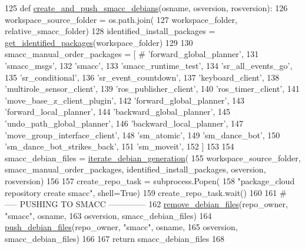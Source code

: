 \begin{DoxyCode}
125 \textcolor{keyword}{def }\hyperlink{namespacegenerate__debs_af7237c463c8e5b4df369e6befc154c50}{create\_and\_push\_smacc\_debians}(osname, osversion, rosversion):
126     workspace\_source\_folder = os.path.join(
127         workspace\_folder, relative\_smacc\_folder)
128     identified\_install\_packages = \hyperlink{namespacegenerate__debs_aa91b87c6d9c3ed04015845cc9298431a}{get\_identified\_packages}(workspace\_folder)
129 
130     smacc\_manual\_order\_packages = [  \textcolor{comment}{# 'forward\_global\_planner',}
131         \textcolor{stringliteral}{'smacc\_msgs'},
132         \textcolor{stringliteral}{'smacc'},
133         \textcolor{stringliteral}{'smacc\_runtime\_test'},
134         \textcolor{stringliteral}{'sr\_all\_events\_go'},
135         \textcolor{stringliteral}{'sr\_conditional'},
136         \textcolor{stringliteral}{'sr\_event\_countdown'},
137         \textcolor{stringliteral}{'keyboard\_client'},
138         \textcolor{stringliteral}{'multirole\_sensor\_client'},
139         \textcolor{stringliteral}{'ros\_publisher\_client'},
140         \textcolor{stringliteral}{'ros\_timer\_client'},
141         \textcolor{stringliteral}{'move\_base\_z\_client\_plugin'},
142         \textcolor{stringliteral}{'forward\_global\_planner'},
143         \textcolor{stringliteral}{'forward\_local\_planner'},
144         \textcolor{stringliteral}{'backward\_global\_planner'},
145         \textcolor{stringliteral}{'undo\_path\_global\_planner'},
146         \textcolor{stringliteral}{'backward\_local\_planner'},        
147         \textcolor{stringliteral}{'move\_group\_interface\_client'},
148         \textcolor{stringliteral}{'sm\_atomic'},
149         \textcolor{stringliteral}{'sm\_dance\_bot'},
150         \textcolor{stringliteral}{'sm\_dance\_bot\_strikes\_back'},
151         \textcolor{stringliteral}{'sm\_moveit'},
152     ]
153 
154     smacc\_debian\_files = \hyperlink{namespacegenerate__debs_a2615a6fc7860b6aa9e920e6b4d886589}{iterate\_debian\_generation}(
155         workspace\_source\_folder, smacc\_manual\_order\_packages, identified\_install\_packages, osversion, 
      rosversion)
156 
157     create\_repo\_task = subprocess.Popen(
158         \textcolor{stringliteral}{"package\_cloud repository create smacc"}, shell=\textcolor{keyword}{True})
159     create\_repo\_task.wait()
160 
161     \textcolor{comment}{# ----- PUSHING TO SMACC --------------}
162     \hyperlink{namespacegenerate__debs_a08095040d038b3613ad0e77fd4e7f60e}{remove\_debian\_files}(repo\_owner, \textcolor{stringliteral}{"smacc"},  osname,
163                         osversion, smacc\_debian\_files)
164     \hyperlink{namespacegenerate__debs_a9b22f5ad65b40b7903c467eda308e575}{push\_debian\_files}(repo\_owner, \textcolor{stringliteral}{"smacc"},  osname,
165                       osversion, smacc\_debian\_files)
166 
167     \textcolor{keywordflow}{return} smacc\_debian\_files
168 
\end{DoxyCode}
